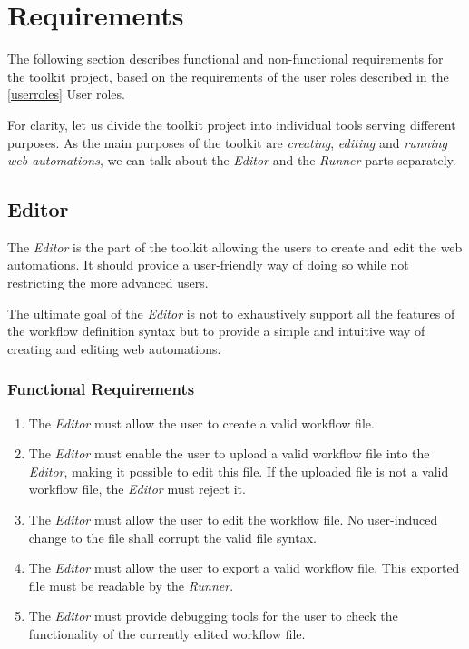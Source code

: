 \section{Requirements}
\label{requirements}

The following section describes functional and non-functional requirements for the toolkit project, 
based on the requirements of the user roles described in the \autoref{userroles} User roles.

For clarity, let us divide the toolkit project into individual tools serving different purposes.
As the main purposes of the toolkit are \textit{creating}, \textit{editing} and \textit{running web automations},
we can talk about the \textit{Editor} and the \textit{Runner} parts separately.

\emptyline
\subsection{Editor}

The \textit{Editor} is the part of the toolkit allowing the users to create and edit the web automations.
It should provide a user-friendly way of doing so while not restricting the more advanced users.

The ultimate goal of the \textit{Editor} is not to exhaustively support all the features of the workflow definition syntax but to provide a simple and intuitive way of creating and editing web automations.

\smallskip

\subsubsection{Functional Requirements}

\begin{enumerate}[label=\thesubsection.1.\arabic*]
    \item The \textit{Editor} must allow the user to create a valid workflow file.
    \item The \textit{Editor} must enable the user to upload a valid workflow file into the \textit{Editor}, 
    making it possible to edit this file. If the uploaded file is not a valid workflow file, the \textit{Editor}
    must reject it.
    \item The \textit{Editor} must allow the user to edit the workflow file. 
    No user-induced change to the file shall corrupt the valid file syntax.
    \item The \textit{Editor} must allow the user to export a valid workflow file. 
    This exported file must be readable by the \textit{Runner}.
    \item The \textit{Editor} must provide debugging tools for the user to check the functionality of the currently edited workflow file.
\end{enumerate}

